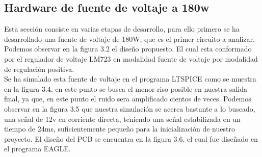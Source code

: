 \subsection{Hardware de fuente de voltaje a 180w}

Esta sección consiste en varias etapas de desarrollo, para ello primero se ha desarrollado una fuente de voltaje de 180W, que es el primer circuito a analizar. Podemos observar en la figura 3.2 el diseño propuesto. El cual esta conformado por el regulador de voltaje LM723 en modalidad fuente de voltaje por modalidad de regulación positiva.\\

Se ha simulado esta fuente de voltaje en el programa LTSPICE como se muestra en la figura 3.4, en este punto se busca el menor riso posible en nuestra salida final, ya que, en este punto el ruido sera amplificado cientos de veces. Podemos observar en la figura 3.5 que nuestra simulación se acerca bastante a lo buscado, una señal de 12v en corriente directa, teniendo una señal estabilizada en un tiempo de 24ms, suficientemente pequeño para la inicialización de nuestro proyecto. El diseño del PCB se encuentra en la figura 3.6, el cual fue diseñado en el programa EAGLE.\\

